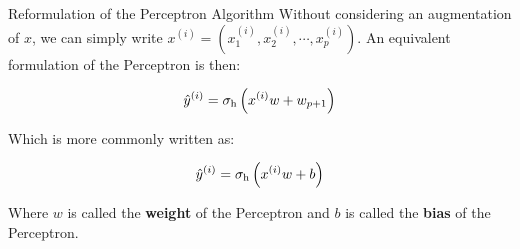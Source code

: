 \begin{frame}{Reformulation of the Perceptron Algorithm}
	Without considering an augmentation of $x$, we can simply write $x^{(i)} = (x_1^{(i)}, x_2^{(i)}, \cdots, x_p^{(i)})$. An equivalent formulation of the Perceptron is then:
	
	\begin{equation*}
		\hat{y}^{(i)} = \operatorname{\sigma_h}\left(x^{(i)} w + w_{p+1}\right)
	\end{equation*}
	
	Which is more commonly written as:
	
	\begin{equation*}
		\hat{y}^{(i)} = \operatorname{\sigma_h}\left(x^{(i)} w + b\right)
	\end{equation*}
	
	Where $w$ is called the \textbf{weight} of the Perceptron and $b$ is called the \textbf{bias} of the Perceptron.
\end{frame}

